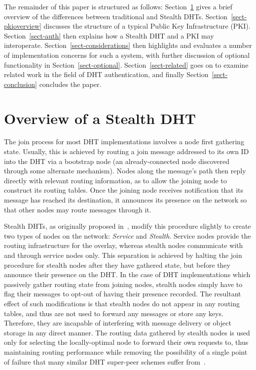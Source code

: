 \documentclass{elsart3p}
\begin{document}
The remainder of this paper is structured as follows:
Section~\ref{sect-dhtoverview} gives a brief overview of the
differences between traditional and Stealth DHTs.
Section~\ref{sect-pkioverview} discusses the structure of a typical
Public Key Infrastructure (PKI). Section~\ref{sect-auth} then
explains how a Stealth DHT and a PKI may interoperate.
Section~\ref{sect-considerations} then highlights and evaluates a
number of implementation concerns for such a system, with further
discussion of optional functionality in Section~\ref{sect-optional}.
Section~\ref{sect-related} goes on to examine related work in the
field of DHT authentication, and finally
Section~\ref{sect-conclusion} concludes the paper.

\section{Overview of a Stealth DHT}
\label{sect-dhtoverview}

The join process for most DHT implementations involves a node first
gathering state. Usually, this is achieved by routing a join message
addressed to its own ID into the DHT via a bootstrap node (an
already-connected node discovered through some alternate mechanism).
Nodes along the message's path then reply directly with relevant
routing information, as to allow the joining node to construct its
routing tables. Once the joining node receives notification that its
message has reached its destination, it announces its presence on
the network so that other nodes may route messages through it.

Stealth DHTs, as originally proposed in~\cite{Brampton06Stealth},
modify this procedure slightly to create two types of nodes on the
network: \emph{Service} and \emph{Stealth}. Service nodes provide
the routing infrastructure for the overlay, whereas stealth nodes
communicate with and through service nodes only. This separation is
achieved by halting the join procedure for stealth nodes after they
have gathered state, but before they announce their presence on the
DHT. In the case of DHT implementations which passively gather
routing state from joining nodes, stealth nodes simply have to flag their messages to
opt-out of having their presence recorded. The resultant effect of
such modifications is that stealth nodes do not appear in any
routing tables, and thus are not used to forward any messages or
store any keys. Therefore, they are incapable of interfering with
message delivery or object storage in any direct manner. The routing
data gathered by stealth nodes is used only for selecting the
locally-optimal node to forward their own requests to, thus
maintaining routing performance while removing the possibility of a
single point of failure that many similar DHT super-peer schemes
suffer from~\cite{Mizrak03Structured,zhu2003super}.
\end{document}

